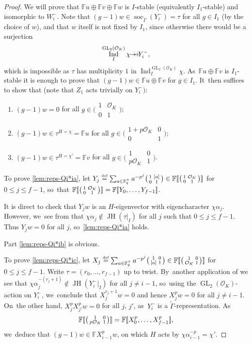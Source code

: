\documentclass[JEP,XML,SOM,Unicode,NoFloatCountersInSection, NoEqCountersInSection,published]{cedram}
\newenvironment{enumeratea}
{\bgroup\def\theenumi{\alph{enumi}}\begin{enumerate}}
{\end{enumerate}\egroup}
\newcommand{\onto}{\mathchoice{\to\hspace*{-5mm}\to}{\mathrel{\hbox{$\to\hspace*{-2.85mm}\to$}}}{\to\hspace*{-3mm}\to}{\to\hspace*{-3mm}\to}}
\let\wt\widetilde
\renewcommand{\theenumi}{\roman{enumi}}
\newcommand{\defeq}{\stackrel{\textrm{\tiny{\upshape{def}}}}{=}}
\newcommand{\F}{\mathbb{F}}
\newcommand{\cO}{\mathcal{O}}
\newcommand{\bbra}[1]{[\mkern-3mu[#1]\mkern-3mu]}
\DeclareMathOperator{\GL}{GL}
\DeclareMathOperator{\Ind}{Ind}
\DeclareMathOperator{\JH}{\mathrm{JH}}
\DeclareMathOperator{\soc}{soc}
\newcommand{\smatr}[4]{\bigl(\begin{smallmatrix} {#1}& {#2}\\ {#3}&{#4}\end{smallmatrix}\bigr)}
\theoremstyle{plain}
\theoremstyle{definition}
\begin{document}
\begin{proof}
We will prove that $\F u \oplus \F v\oplus \F w$ is $I$-stable (equivalently $I_1$-stable) and isomorphic to $W_i^-$.
Note that $(g-1)w \in \soc_{\wt\Gamma}(Y_i^-) = \tau$ for all $g \in I_1$ (by the choice of $w$), and that $w$ itself is not fixed by $I_1$, since otherwise there would be a surjection
\[
\Ind_I^{\GL_2(\cO_K)}\chi\onto Y_i^-,
\]
which is impossible as $\tau$ has
multiplicity $1$ in $\Ind_I^{\GL_2(\cO_K)}\chi$. As~$\F u \oplus \F v$ is $I_1$-stable it is enough to prove that $(g-1)w\in \F u \oplus \F v$ for
$g\in I_1$. It~then suffices to show that (note that $Z_1$ acts trivially on $Y_i^-)$:
\begin{enumeratea}
\item\label{lem:reps-Qi*ia}
$(g-1)w = 0$ for all $g \in \smatr{1}{\cO_K}01$;
\item\label{lem:reps-Qi*ib}
$(g-1)w \in \tau^{H = \chi} = \F u$ for all $g \in \smatr{1+p\cO_K}001$;
\item\label{lem:reps-Qi*ic}
$(g-1)w \in \tau^{H = \chi'} = \F v$ for all $g \in \smatr{1}0{p\cO_K}1$.
\end{enumeratea}

To prove \eqref{lem:reps-Qi*ia}, let $Y_j \defeq \sum_{a\in\F_q^\times}a^{-p^j}\smatr{1}{[a]}0{1}\in\F\bbra{\smatr1{\cO_K}01}$ for $0 \le j \le f-1$, so~that $\F\bbra{\smatr{1}{\cO_K}01} = \F\bbra{Y_0,\dots,Y_{f-1}}$.

It is direct to check that $Y_jw$ is an $H$-eigenvector with eigencharacter $\chi\alpha_j$. However, we~see from \cite[Lem.\,2.7]{BP} that $\chi \alpha_j \notin \JH(\tau|_I)$ for all $j$ such that $0 \le j \le f-1$.
Thus $Y_j w = 0$ for all $j$, so~\eqref{lem:reps-Qi*ia} holds.

Part \eqref{lem:reps-Qi*ib} is obvious.

To prove \eqref{lem:reps-Qi*ic}, let $X_j \defeq \sum_{a\in\F_q^\times}a^{-p^j}\smatr{1}0{[a]}{1}\in\F\bbra{\smatr{1}0{\cO_K}1}$ for $0 \le j \le f-1$.
Write $\tau=(r_0,\dots,r_{f-1})$ up to twist. By~another application of \cite[Lem.\,2.7]{BP} we see that $\chi \alpha_j^{-(r_j+1)} \notin \JH(Y_i^-|_I)$ for all $j \ne i-1$, so~using the $\GL_2(\cO_K)$-action on $Y_i^-$, we~conclude that $X_j^{r_j+1} w = 0$ and hence $X_j^p w = 0$ for all $j \ne i-1$. On~the other hand, $X_j^p X_{j'}^p w = 0$ for all $j$, $j'$, as~$Y_i^-$ is a $\wt\Gamma$-representation. As
\[
\F\bbra{\smatr{1}0{p\cO_K}1} = \F\bbra{X_0^p,\dots,X_{f-1}^p},
\]
we~deduce that $(g-1)w \in \F X_{i-1}^p w$, on which $H$ acts by $\chi \alpha_{i-1}^{-p} = \chi'$.


\end{proof}
\end{document}
